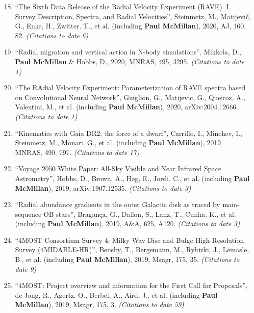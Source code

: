 \documentclass{resume}
\begin{document}
\begin{enumerate}
\setcounter{enumi}{17}
\item ``The Sixth Data Release of the Radial Velocity Experiment (RAVE). I. Survey Description, Spectra, and Radial Velocities'', Steinmetz, M., Matijevi\v{c}, G., Enke, H., Zwitter, T., et al. (including \textbf{Paul McMillan}), 2020, AJ, 160, 82. \textit{(Citations to date 6)}

\item ``Radial migration and vertical action in N-body simulations'', Mikkola, D., \textbf{Paul McMillan} \& Hobbs, D., 2020, MNRAS, 495, 3295. \textit{(Citations to date 1)}

\item ``The RAdial Velocity Experiment: Parameterization of RAVE spectra based on Convolutional Neural Network'', Guiglion, G., Matijevic, G., Queiroz, A., Valentini, M., et al. (including \textbf{Paul McMillan}), 2020, arXiv:2004.12666. \textit{(Citations to date 1)}

\item ``Kinematics with Gaia DR2: the force of a dwarf'', Carrillo, I., Minchev, I., Steinmetz, M., Monari, G., et al. (including \textbf{Paul McMillan}), 2019, MNRAS, 490, 797. \textit{(Citations to date 17)}

\item ``Voyage 2050 White Paper: All-Sky Visible and Near Infrared Space Astrometry'', Hobbs, D., Brown, A., H{\o}g, E., Jordi, C., et al. (including \textbf{Paul McMillan}), 2019, arXiv:1907.12535. \textit{(Citations to date 3)}

\item ``Radial abundance gradients in the outer Galactic disk as traced by main-sequence OB stars'', Bragan\c{c}a, G., Daflon, S., Lanz, T., Cunha, K., et al. (including \textbf{Paul McMillan}), 2019, A\&A, 625, A120. \textit{(Citations to date 3)}

\item ``4MOST Consortium Survey 4: Milky Way Disc and Bulge High-Resolution Survey (4MIDABLE-HR)'', Bensby, T., Bergemann, M., Rybizki, J., Lemasle, B., et al. (including \textbf{Paul McMillan}), 2019, Msngr, 175, 35. \textit{(Citations to date 9)}

\item ``4MOST: Project overview and information for the First Call for Proposals'', de Jong, R., Agertz, O., Berbel, A., Aird, J., et al. (including \textbf{Paul McMillan}), 2019, Msngr, 175, 3. \textit{(Citations to date 59)}


\end{enumerate}
\end{document}
